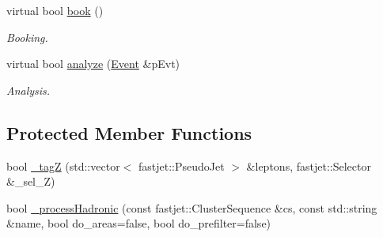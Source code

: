 \begin{CompactItemize}
\item 
virtual bool \hyperlink{classHZAnalysis_b2b6a462ad983ce4b847c7c010df6ec8}{book} ()
\begin{CompactList}\small\item\em Booking. \item\end{CompactList}\item 
virtual bool \hyperlink{classHZAnalysis_9ff7e307f88b5a063fc047b38814c36c}{analyze} (\hyperlink{classEvent}{Event} \&p\-Evt)
\begin{CompactList}\small\item\em Analysis. \item\end{CompactList}\end{CompactItemize}
\subsection*{Protected Member Functions}
\begin{CompactItemize}
\item 
bool \hyperlink{classHZAnalysis_2ca8d0f2ed538de275b62f7cd8f93178}{\_\-tag\-Z} (std::vector$<$ fastjet::Pseudo\-Jet $>$ \&leptons, fastjet::Selector \&\_\-sel\_\-Z)
\item 
bool \hyperlink{classHZAnalysis_9b58f6652dc4d1d03d513c4ab14450ee}{\_\-process\-Hadronic} (const fastjet::Cluster\-Sequence \&cs, const std::string \&name, bool do\_\-areas=false, bool do\_\-prefilter=false)
\end{CompactItemize}
